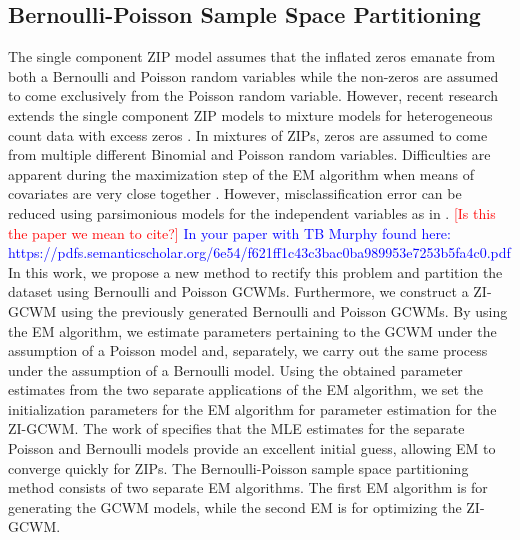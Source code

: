\documentclass[11pt,letterpaper]{article}
\numberwithin{equation}{section}
\numberwithin{equation}{section}
\numberwithin{equation}{section}
\begin{document}
\subsection{Bernoulli-Poisson Sample Space Partitioning}

The single component ZIP model assumes that the inflated zeros emanate from both a Bernoulli and Poisson random variables while the non-zeros are assumed to come exclusively from the Poisson random variable. However, recent research  extends the single component ZIP models to mixture models for heterogeneous count data with excess zeros \citep[see][]{Bermudez+Karlis:2012}. In mixtures of ZIPs, zeros are assumed to come from multiple different Binomial and Poisson random variables. Difficulties are apparent  during the maximization step of the EM algorithm when means of covariates are very close together \cite[see][]{LimHwa}. However, misclassification error can be reduced using parsimonious models for the independent variables as in  \cite{McNicholas:2010}. \textcolor{red}{[Is this the paper we mean to cite?]} \textcolor{blue}{In your paper with  TB Murphy found here: https://pdfs.semanticscholar.org/6e54/f621ff1c43c3bac0ba989953e7253b5fa4c0.pdf
}
	In this work, we propose a new method to rectify this problem and partition the dataset using Bernoulli and Poisson GCWMs. Furthermore, we construct a ZI-GCWM using the previously generated Bernoulli and Poisson GCWMs. By using the EM algorithm, we estimate parameters pertaining to the GCWM under the assumption of a Poisson model and, separately, we carry out the same process under the assumption of a Bernoulli model. Using the obtained parameter estimates from the two separate applications of the EM algorithm, we set the initialization parameters for the EM algorithm for parameter estimation for the ZI-GCWM. The work of \cite{Lambert} specifies that the MLE estimates for the separate Poisson and Bernoulli models provide an excellent initial guess, allowing EM to converge quickly for ZIPs. The Bernoulli-Poisson sample space partitioning method consists of two separate EM algorithms. The first EM algorithm is for generating the GCWM models, while the second EM is for optimizing the ZI-GCWM. 
	
\end{document}
